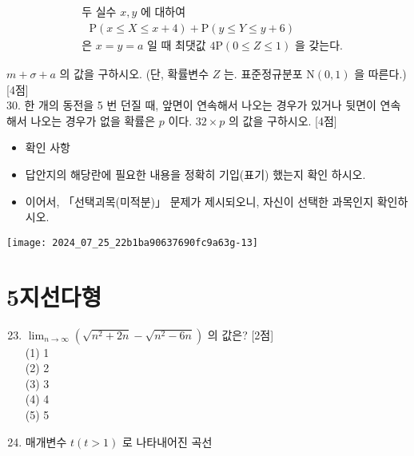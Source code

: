 \documentclass[10pt]{article}
\begin{document}
\[
\begin{aligned}
& \text { 두 실수 } x, y \text { 에 대하여 } \\
& \quad \mathrm{P}(x \leq X \leq x+4)+\mathrm{P}(y \leq Y \leq y+6) \\
& \text { 은 } x=y=a \text { 일 때 최댓값 } 4 \mathrm{P}(0 \leq Z \leq 1) \text { 을 갖는다. }
\end{aligned}
\]

$m+\sigma+a$ 의 값을 구하시오. (단, 확률변수 $Z$ 는. 표준정규분포 $\mathrm{N}(0,1)$ 을 따른다.) [4점]\\
30. 한 개의 동전을 5 번 던질 때, 앞면이 연속해서 나오는 경우가 있거나 뒷면이 연속해서 나오는 경우가 없을 확률은 $p$ 이다. $32 \times p$ 의 값을 구하시오. [4점]

\begin{itemize}
  \item 확인 사항
\end{itemize}

\begin{itemize}
  \item 답안지의 해당란에 필요한 내용을 정확히 기입(표기) 했는지 확인 하시오.

  \item 이어서, 「선택괴목(미적분)」 문제가 제시되오니, 자신이 선택한 과목인지 확인하시오.

\end{itemize}

\begin{center}
\texttt{[image: 2024\_07\_25\_22b1ba90637690fc9a63g-13]}
\end{center}

\section*{5지선다형}
\begin{enumerate}
  \setcounter{enumi}{22}
  \item $\lim _{n \rightarrow \infty}\left(\sqrt{n^{2}+2 n}-\sqrt{n^{2}-6 n}\right)$ 의 값은? [2점]\\
(1) 1\\
(2) 2\\
(3) 3\\
(4) 4\\
(5) 5

  \item 매개변수 $t(t>1)$ 로 나타내어진 곡선

\end{enumerate}
\end{document}
